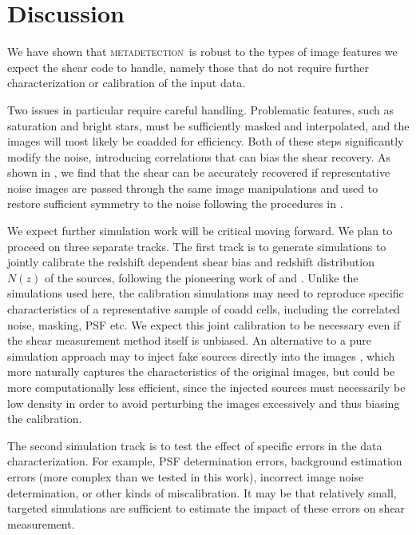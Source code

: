 \documentclass[twocolumn,twocolappendix,astrosym]{openjournal}
\newcommand{\mdet}{\textsc{metadetection}}
\begin{document}
\section{Discussion} \label{sec:summary}

We have shown that \mdet\ is robust to the types of image features we expect
the shear code to handle, namely those that do not require further
characterization or calibration of the input data.

Two issues in particular require careful handling.  Problematic features, such
as saturation and bright stars, must be sufficiently masked and interpolated,
and the images will most likely be coadded for efficiency. Both of these steps
significantly modify the noise, introducing correlations that can bias the
shear recovery.  As shown in \citep{BeckerMdetCoadd}, we find that the shear can
be accurately recovered if representative noise images are passed through the
same image manipulations and used to restore sufficient symmetry to the noise
following the procedures in \cite{SheldonMcal2017}.

We expect further simulation work will be critical moving forward.  We plan to
proceed on three separate tracks.  The first track is to generate simulations to
jointly calibrate the redshift dependent shear bias and redshift distribution
$N(z)$ of the sources, following the pioneering work of \cite{MacCrann2022} and
\cite{LiNofz2022}.  Unlike the simulations used here, the calibration
simulations may need to reproduce specific characteristics of a representative
sample of coadd cells, including the correlated noise, masking, PSF etc.  We
expect this joint calibration to be necessary even if the shear measurement
method itself is unbiased.  An alternative to a pure simulation approach may to
inject fake sources directly into the images
\citep{SuchytaBalrog2016,EverettBalrog2022}, which more naturally captures the
characteristics of the original images, but could be more computationally
less efficient, since the injected sources must necessarily be low density 
in order to avoid perturbing the images excessively and thus biasing the
calibration.

The second simulation track is to test the effect of specific errors in the
data characterization.  For example, PSF determination errors, background
estimation errors (more complex than we tested in this work), incorrect image
noise determination, or other kinds of miscalibration.  It may be that
relatively small, targeted simulations are sufficient to estimate the impact of
these errors on shear measurement.
\end{document}
